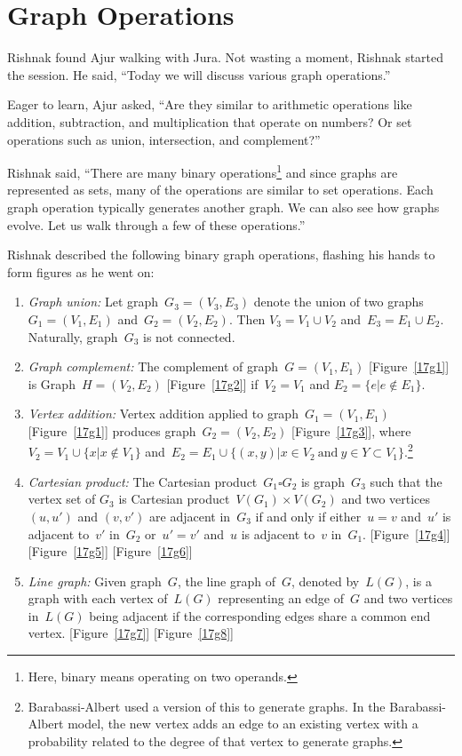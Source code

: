 \chapter{Graph Operations}

Rishnak found Ajur walking with Jura. Not wasting a moment, Rishnak started the session. He said, ``Today we will discuss various graph operations.''

Eager to learn, Ajur asked, ``Are they similar to arithmetic operations like addition, subtraction, and multiplication that operate on numbers? Or set operations such as union, intersection, and complement?''

Rishnak said, ``There are many binary operations\footnote{Here, binary means operating on two operands.} and since graphs are represented as sets, many of the operations are similar to set operations. Each graph operation typically generates another graph. We can also see how graphs evolve. Let us walk through a few of these operations.'' 

Rishnak described the following binary graph operations, flashing his hands to form figures as he went on:
\begin{enumerate}
    \item \textit{Graph union:} Let graph~$G_3=(V_3,E_3)$ denote the union of two graphs~$G_1=(V_1,E_1)$ and~$G_2=(V_2,E_2)$. Then $V_3=V_1\cup V_2$ and~$E_3=E_1\cup E_2$. Naturally, graph~$G_3$ is not connected. 
    \item \textit{Graph complement:} The complement of graph~$G=(V_1,E_1)$ [Figure~\ref{17g1}] is Graph~$H=(V_2,E_2)$ [Figure~\ref{17g2}] if~$V_2=V_1$ and $E_2=\{e|e\notin E_1\}$. 
    \item \textit{Vertex addition:} Vertex addition applied to graph~$G_1=(V_1,E_1)$ [Figure~\ref{17g1}] produces graph~$G_2=(V_2,E_2)$ [Figure~\ref{17g3}], where $V_2=V_1\cup\{x|x\notin V_1\}$ and~$E_2=E_1\cup\{(x,y)|x\in V_2\ \text{and}\ y\in Y\subset V_1\}$.\footnote{Barabassi-Albert used a version of this to generate graphs. In the Barabassi-Albert model, the new vertex adds an edge to an existing vertex with a probability related to the degree of that vertex to generate graphs.} 
    \item  \textit{Cartesian product:} The Cartesian product~$G_1\square G_2$ is graph~$G_3$ such that the vertex set of $G_3$ is Cartesian product~$V(G_1)\times V(G_2)$ and two vertices~$(u,u')$ and $(v,v')$ are adjacent in~$G_3$ if and only if either~$u=v$ and~$u'$ is adjacent to~$v'$ in~$G_2$ or~$u'=v'$ and~$u$ is adjacent to~$v$ in~$G_1$. [Figure~\ref{17g4}] [Figure~\ref{17g5}] [Figure~\ref{17g6}] 
    \item \textit{Line graph:} Given graph~$G$, the line graph of~$G$, denoted by~$L(G)$, is a graph with each vertex of~$L(G)$ representing an edge of~$G$ and two vertices in~$L(G)$ being adjacent if the corresponding edges share a common end vertex. [Figure~\ref{17g7}] [Figure~\ref{17g8}] 
\end{enumerate}

